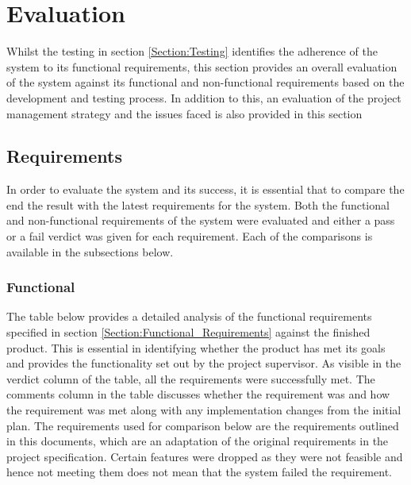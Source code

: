 \section{Evaluation}
Whilst the testing in section \ref{Section:Testing} identifies the adherence of the system to its functional requirements, this section provides an overall evaluation of the system against its functional and non-functional requirements based on the development and testing process. In addition to this, an evaluation of the project management strategy and the issues faced is also provided in this section

\subsection{Requirements}
In order to evaluate the system and its success, it is essential that to compare the end the result with the latest requirements for the system. Both the functional and non-functional requirements of the system were evaluated and either a pass or a fail verdict was given for each requirement. Each of the comparisons is available in the subsections below.

\subsubsection{Functional}
The table below provides a detailed analysis of the functional requirements specified in section \ref{Section:Functional_Requirements} against the finished product. This is essential in identifying whether the product has met its goals and provides the functionality set out by the project supervisor. As visible in the verdict column of the table, all the requirements were successfully met. The comments column in the table discusses whether the requirement was and how the requirement was met along with any implementation changes from the initial plan. The requirements used for comparison below are the requirements outlined in this documents, which are an adaptation of the original requirements in the project specification. Certain features were dropped as they were not feasible and hence not meeting them does not mean that the system failed the requirement.

